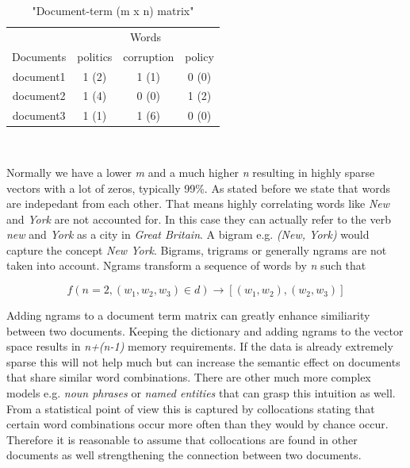     \begin{table}[h!]
      \centering
      \begin{tabular}{c|c|c|c}
        \multicolumn{1}{r|}{} & \multicolumn{3}{c}{Words} \\
        \cline{1-4}
        Documents &   politics &   corruption &  policy  \\
        \hline
        document1 &    1 (2)   &     1 (1)    &   0 (0)  \\
        document2 &    1 (4)   &     0 (0)    &   1 (2)  \\
        document3 &    1 (1)   &     1 (6)    &   0 (0)  \\
      \end{tabular}\\
      \caption{"Document-term (m x n) matrix"}
    \end{table}

    Normally we have a lower \emph{m} and a much higher \emph{n} resulting in highly sparse vectors with a lot of zeros, typically 99\%. As stated before we state that words are indepedant from each other. That means highly correlating words like \emph{New} and \emph{York} are not accounted for. In this case they can actually refer to the verb \emph{new} and \emph{York} as a city in \emph{Great Britain}. A bigram e.g. \emph{(New, York)} would capture the concept \emph{New York}. Bigrams, trigrams or generally ngrams are not taken into account. Ngrams transform a sequence of words by \emph{n} such that 

      \begin{equation}
        f(n = 2, (w_1, w_2, w_3) \in d) \to [(w_1, w_2),(w_2,w_3)]
      \end{equation}

    Adding ngrams to a document term matrix can greatly enhance similiarity between two documents. Keeping the dictionary and adding ngrams to the vector space results in \emph{n+(n-1)} memory requirements. If the data is already extremely sparse this will not help much but can increase the semantic effect on documents that share similar word combinations. There are other much more complex models e.g. \emph{noun phrases} or \emph{named entities} that can grasp this intuition as well. From a statistical point of view this is captured by collocations stating that certain word combinations occur more often than they would by chance occur. Therefore it is reasonable to assume that collocations are found in other documents as well strengthening the connection between two documents.

